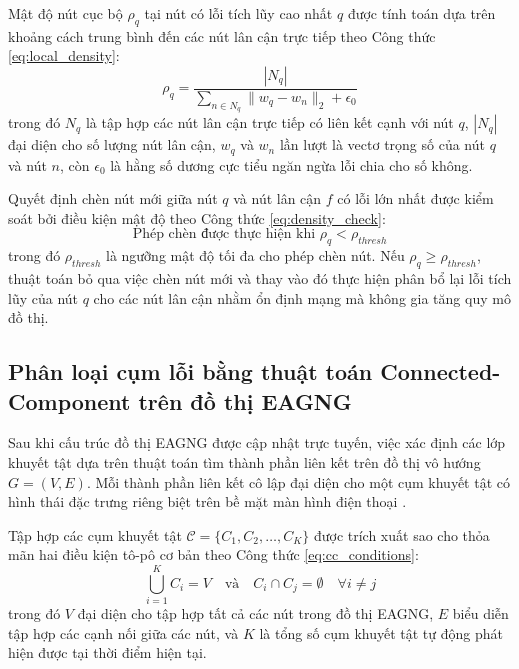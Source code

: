 Mật độ nút cục bộ $\rho_q$ tại nút có lỗi tích lũy cao nhất $q$ được tính toán dựa trên khoảng cách trung bình đến các nút lân cận trực tiếp theo Công thức \ref{eq:local_density}:
\begin{equation}
\label{eq:local_density}
\rho_q = \frac{|N_q|}{\sum_{n \in N_q} \| w_q - w_n \|_2 + \epsilon_0}
\end{equation}
trong đó $N_q$ là tập hợp các nút lân cận trực tiếp có liên kết cạnh với nút $q$, $|N_q|$ đại diện cho số lượng nút lân cận, $w_q$ và $w_n$ lần lượt là vectơ trọng số của nút $q$ và nút $n$, còn $\epsilon_0$ là hằng số dương cực tiểu ngăn ngừa lỗi chia cho số không.

Quyết định chèn nút mới giữa nút $q$ và nút lân cận $f$ có lỗi lớn nhất được kiểm soát bởi điều kiện mật độ theo Công thức \ref{eq:density_check}:
\begin{equation}
\label{eq:density_check}
\text{Phép chèn được thực hiện khi } \rho_q < \rho_{thresh}
\end{equation}
trong đó $\rho_{thresh}$ là ngưỡng mật độ tối đa cho phép chèn nút. Nếu $\rho_q \ge \rho_{thresh}$, thuật toán bỏ qua việc chèn nút mới và thay vào đó thực hiện phân bổ lại lỗi tích lũy của nút $q$ cho các nút lân cận nhằm ổn định mạng mà không gia tăng quy mô đồ thị.


\subsection{Phân loại cụm lỗi bằng thuật toán Connected-Component trên đồ thị EAGNG}
\label{subsec:connected_component_clustering}

Sau khi cấu trúc đồ thị EAGNG được cập nhật trực tuyến, việc xác định các lớp khuyết tật dựa trên thuật toán tìm thành phần liên kết trên đồ thị vô hướng $G = (V, E)$. Mỗi thành phần liên kết cô lập đại diện cho một cụm khuyết tật có hình thái đặc trưng riêng biệt trên bề mặt màn hình điện thoại \cite{tarjan1972depth}.

Tập hợp các cụm khuyết tật $\mathcal{C} = \{C_1, C_2, \dots, C_K\}$ được trích xuất sao cho thỏa mãn hai điều kiện tô-pô cơ bản theo Công thức \ref{eq:cc_conditions}:
\begin{equation}
\label{eq:cc_conditions}
\bigcup_{i=1}^{K} C_i = V \quad \text{và} \quad C_i \cap C_j = \emptyset \quad \forall i \neq j
\end{equation}
trong đó $V$ đại diện cho tập hợp tất cả các nút trong đồ thị EAGNG, $E$ biểu diễn tập hợp các cạnh nối giữa các nút, và $K$ là tổng số cụm khuyết tật tự động phát hiện được tại thời điểm hiện tại.

